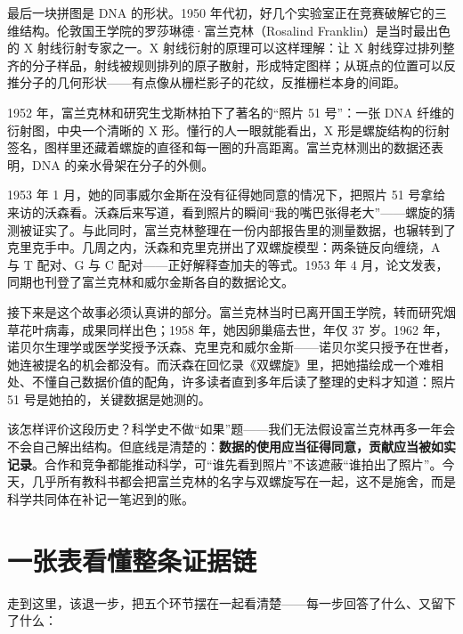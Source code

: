 \begin{zhengju}
最后一块拼图是 DNA 的形状。1950 年代初，好几个实验室正在竞赛破解它的三维结构。伦敦国王学院的罗莎琳德·富兰克林（Rosalind Franklin）是当时最出色的 X 射线衍射专家之一。X 射线衍射的原理可以这样理解：让 X 射线穿过排列整齐的分子样品，射线被规则排列的原子散射，形成特定图样；从斑点的位置可以反推分子的几何形状——有点像从栅栏影子的花纹，反推栅栏本身的间距。

1952 年，富兰克林和研究生戈斯林拍下了著名的“照片 51 号”：一张 DNA 纤维的衍射图，中央一个清晰的 X 形。懂行的人一眼就能看出，X 形是螺旋结构的衍射签名，图样里还藏着螺旋的直径和每一圈的升高距离。富兰克林测出的数据还表明，DNA 的亲水骨架在分子的外侧。

1953 年 1 月，她的同事威尔金斯在没有征得她同意的情况下，把照片 51 号拿给来访的沃森看。沃森后来写道，看到照片的瞬间“我的嘴巴张得老大”——螺旋的猜测被证实了。与此同时，富兰克林整理在一份内部报告里的测量数据，也辗转到了克里克手中。几周之内，沃森和克里克拼出了双螺旋模型：两条链反向缠绕，A 与 T 配对、G 与 C 配对——正好解释查加夫的等式。1953 年 4 月，论文发表，同期也刊登了富兰克林和威尔金斯各自的数据论文。

接下来是这个故事必须认真讲的部分。富兰克林当时已离开国王学院，转而研究烟草花叶病毒，成果同样出色；1958 年，她因卵巢癌去世，年仅 37 岁。1962 年，诺贝尔生理学或医学奖授予沃森、克里克和威尔金斯——诺贝尔奖只授予在世者，她连被提名的机会都没有。而沃森在回忆录《双螺旋》里，把她描绘成一个难相处、不懂自己数据价值的配角，许多读者直到多年后读了整理的史料才知道：照片 51 号是她拍的，关键数据是她测的。

该怎样评价这段历史？科学史不做“如果”题——我们无法假设富兰克林再多一年会不会自己解出结构。但底线是清楚的：\textbf{数据的使用应当征得同意，贡献应当被如实记录}。合作和竞争都能推动科学，可“谁先看到照片”不该遮蔽“谁拍出了照片”。今天，几乎所有教科书都会把富兰克林的名字与双螺旋写在一起，这不是施舍，而是科学共同体在补记一笔迟到的账。
\end{zhengju}

\section{一张表看懂整条证据链}

走到这里，该退一步，把五个环节摆在一起看清楚——每一步回答了什么、又留下了什么：

